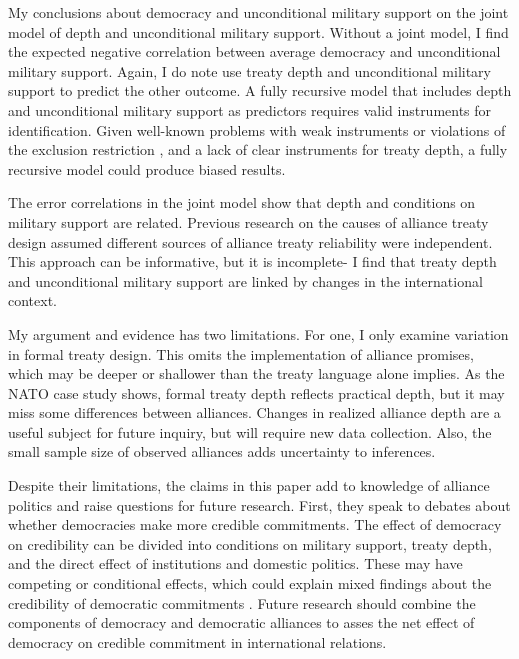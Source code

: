 \documentclass[12pt]{article}
\begin{document}
My conclusions about democracy and unconditional military support on the joint model of depth and unconditional military support.
Without a joint model, I find the expected negative correlation between average democracy and unconditional military support.   
Again, I do note use treaty depth and unconditional military support to predict the other outcome. 
A fully recursive model that includes depth and unconditional military support as predictors requires valid instruments for identification.
Given well-known problems with weak instruments \citep{Kraay2012} or violations of the exclusion restriction \citep{Bartels1991}, and a lack of clear instruments for treaty depth, a fully recursive model could produce biased results.  


The error correlations in the joint model show that depth and conditions on military support are related.  
Previous research on the causes of alliance treaty design \citep{Benson2012, Mattes2012, Chibaetal2015} assumed different sources of alliance treaty reliability were independent. 
This approach can be informative, but it is incomplete- I find that treaty depth and unconditional military support are linked by changes in the international context. 


My argument and evidence has two limitations. 
For one, I only examine variation in formal treaty design. 
This omits the implementation of alliance promises, which may be deeper or shallower than the treaty language alone implies. 
As the NATO case study shows, formal treaty depth reflects practical depth, but it may miss some differences between alliances. 
Changes in realized alliance depth are a useful subject for future inquiry, but will require new data collection.
Also, the small sample size of observed alliances adds uncertainty to inferences.  


Despite their limitations, the claims in this paper add to knowledge of alliance politics and raise questions for future research. 
First, they speak to debates about whether democracies make more credible commitments. 
The effect of democracy on credibility can be divided into conditions on military support, treaty depth, and the direct effect of institutions and domestic politics. 
These may have competing or conditional effects, which could explain mixed findings about the credibility of democratic commitments \citep{Schultz1999, Leeds1999, Thyne2012, DownesSechser2012}.
Future research should combine the components of democracy and democratic alliances to asses the net effect of democracy on credible commitment in international relations. 
\end{document}
